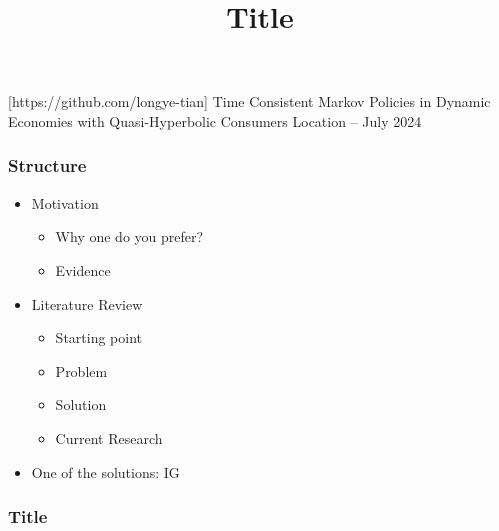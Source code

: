 \documentclass[11pt,xcolor={dvipsnames},hyperref={pdftex,pdfpagemode=UseNone,hidelinks,pdfdisplaydoctitle=true},usepdftitle=false]{beamer}
\begin{document}
\title{Title}

\information
%
[https://github.com/longye-tian]
%
{Time Consistent Markov Policies in Dynamic Economies with Quasi-Hyperbolic Consumers}
%
{Location -- July 2024}

\frame{\titlepage}

\begin{frame}
\frametitle{Structure}
\begin{itemize}
\item Motivation
\begin{itemize}
\item Why one do you prefer?
\item Evidence
\end{itemize}
\item Literature Review
\begin{itemize}
\item Starting point
\item Problem
\item Solution
\item Current Research
\end{itemize}
\item One of the solutions: IG
\end{itemize}
\end{frame}

\begin{frame}
\frametitle{Title}
\end{frame}
\end{document}
